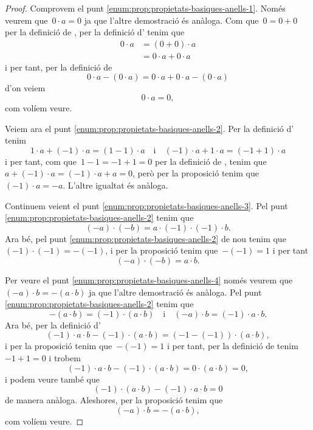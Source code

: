 \documentclass[../estructures-algebraiques.tex]{subfiles}
\begin{document}
    \begin{proof}
        Comprovem el punt \eqref{enum:prop:propietats-basiques-anells-1}.
        Només veurem que~\(0\cdot a=0\) ja que l'altre demostració és anàloga.
        Com que~\(0=0+0\) per la definició de , per la definició d' tenim que
        \begin{align*}
        0\cdot a&=(0+0)\cdot a\\
        &=0\cdot a+0\cdot a
        \end{align*}
        i per tant, per la definició de 
        \[
            0\cdot a-(0\cdot a)=0\cdot a+0\cdot a-(0\cdot a)
        \]
        d'on veiem
        \[
            0\cdot a=0,
        \]
        com volíem veure.

        Veiem ara el punt \eqref{enum:prop:propietats-basiques-anells-2}.
        Per la definició d' tenim
        \[
            1\cdot a+(-1)\cdot a=(1-1)\cdot a\quad\text{i}\quad(-1)\cdot a+1\cdot a=(-1+1)\cdot a
        \]
        i per tant, com que~\(1-1=-1+1=0\) per la definició de , tenim que~\(a+(-1)\cdot a=(-1)\cdot a+a=0\), però per la proposició  tenim que~\((-1)\cdot a=-a\).
        L'altre igualtat és anàloga.

        Continuem veient el punt \eqref{enum:prop:propietats-basiques-anells-3}.
        Pel punt \eqref{enum:prop:propietats-basiques-anells-2} tenim que
        \[
            (-a)\cdot(-b)=a\cdot (-1)\cdot(-1)\cdot b.
        \]
        Ara bé, pel punt \eqref{enum:prop:propietats-basiques-anells-2} de nou tenim que~\((-1)\cdot(-1)=-(-1)\), i per la proposició  tenim que~\(-(-1)=1\) i per tant
        \[
            (-a)\cdot(-b)=a\cdot b.
        \]

        Per veure el punt \eqref{enum:prop:propietats-basiques-anells-4} només veurem que~\((-a)\cdot b=-(a\cdot b)\) ja que l'altre demostració és anàloga.
        Pel punt \eqref{enum:prop:propietats-basiques-anells-2} tenim que
        \[
            -(a\cdot b)=(-1)\cdot(a\cdot b)\quad{\text{i}}\quad(-a)\cdot b=(-1)\cdot a\cdot b.
        \]
        Ara bé, per la definició d'
        \[
            (-1)\cdot a\cdot b-(-1)\cdot(a\cdot b)=(-1-(-1))\cdot(a\cdot b),
        \]
        i per la proposició  tenim que~\(-(-1)=1\) i per tant, per la definició de  tenim~\(-1+1=0\) i trobem
        \[
            (-1)\cdot a\cdot b-(-1)\cdot(a\cdot b)=0\cdot(a\cdot b)=0,
        \]
        i podem veure també que
        \[
            (-1)\cdot(a\cdot b)-(-1)\cdot a\cdot b=0
        \]
        de manera anàloga.
        Aleshores, per la proposició  tenim que
        \[
            (-a)\cdot b=-(a\cdot b),
        \]
        com volíem veure.
    \end{proof}
\end{document}
